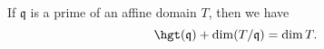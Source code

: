 If $\mathfrak{q}$ is a prime of an affine domain $T$, then we have
\[ \hgt(\mathfrak{q}) + \dim(T/\mathfrak{q}) = \dim T. \]

